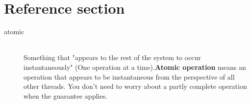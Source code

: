 \documentclass{article}
\begin{document}
\newpage

\section*{Reference section} \label{sec:reference}
\begin{description}
	\item[atomic] \hfill \\ Something that "appears to the rest of the system to occur instantaneously" (One operation at a time).\textbf{Atomic operation} means an operation that appears to be instantaneous from the perspective of all other threads. You don't need to worry about a partly complete operation when the guarantee applies.
\end{description}
\end{document}
